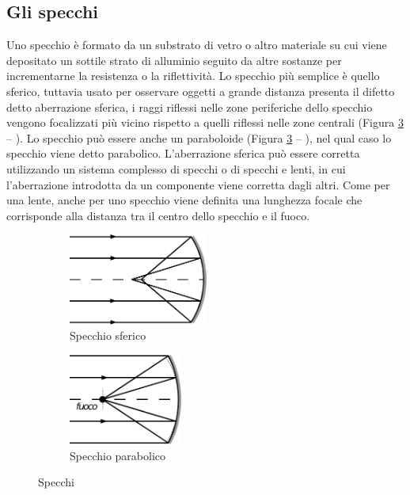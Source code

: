 \subsection{Gli specchi}

Uno specchio è formato da un substrato di vetro o altro materiale su cui viene depositato un sottile
strato di alluminio seguito da altre sostanze per incrementarne la resistenza o la riflettività. Lo
specchio più semplice è quello sferico, tuttavia  usato per osservare oggetti a
grande distanza presenta il difetto detto aberrazione sferica,  i raggi riflessi nelle zone
periferiche dello specchio vengono focalizzati più vicino rispetto a quelli riflessi nelle zone centrali
(Figura \ref{fig:specchi} -- ).
Lo specchio può essere anche un paraboloide (Figura \ref{fig:specchi} -- ), nel qual caso lo specchio viene detto parabolico. 
L'aberrazione sferica può essere corretta utilizzando un sistema  complesso di specchi o di specchi e lenti, in cui l'aberrazione introdotta da un componente viene corretta dagli altri.
Come per una lente, anche per uno specchio viene definita una lunghezza focale che corrisponde
alla distanza tra il centro dello specchio e il fuoco.

\begin{figure}
\begin{subfigure}[b]{.5\textwidth}
\centering
\includegraphics[height=3cm]{img/specchio-sferico.pdf}
\caption{Specchio sferico}\label{fig:specchio-sferico}
\end{subfigure}
\begin{subfigure}[b]{.5\textwidth}
\centering
\includegraphics[height=3cm]{img/specchio-parabolico.pdf}
\caption{Specchio parabolico}\label{fig:specchio-parabolico}
\end{subfigure}
\caption{Specchi}
\label{fig:specchi}
\end{figure}


